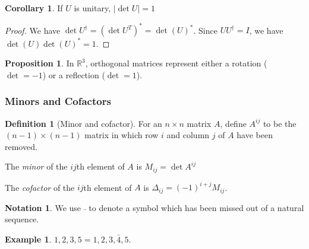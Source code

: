 \documentclass[a4paper]{article}
\theoremstyle{definition}
\newtheorem*{prop}{Proposition}
\newtheorem*{defi}{Definition}
\newtheorem*{eg}{Example}
\newtheorem*{notation}{Notation}
\newtheorem*{cor}{Corollary}
\newcommand{\R}{\mathbb{R}}
\begin{document}
\begin{cor}
  If $U$ is unitary, $|\det U| = 1$
\end{cor}

\begin{proof}
  We have $\det U^\dagger = (\det U^T)^* = \det(U)^*$. Since $UU^\dagger = I$, we have $\det(U)\det(U)^* = 1$.
\end{proof}

\begin{prop}
  In $\R^3$, orthogonal matrices represent either a rotation ($\det = -1$) or a reflection ($\det = 1$).
\end{prop}
\subsubsection{Minors and Cofactors}
\begin{defi}[Minor and cofactor]
  For an $n\times n$ matrix $A$, define $A^{ij}$ to be the $(n - 1)\times (n - 1)$ matrix in which row $i$ and column $j$ of $A$ have been removed.

  The \emph{minor} of the $ij$th element of $A$ is $M_{ij} = \det A^{ij}$

  The \emph{cofactor} of the $ij$th element of $A$ is $\Delta_{ij} = (-1)^{i + j}M_{ij}$.
\end{defi}

\begin{notation}
  We use $\bar \;$ to denote a symbol which has been missed out of a natural sequence.
\end{notation}
\begin{eg}
  $1, 2, 3, 5 = 1, 2, 3, \bar 4, 5$.

\end{eg}
\end{document}
